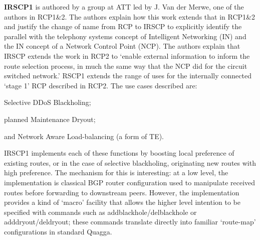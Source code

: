 \bigskip

\textbf{IRSCP1} \cite{VanDerMerwe2006} is authored by a group at ATT led by J. Van der Merwe, one of the authors in RCP1\&2.
The authors explain how this work extends that in RCP1\&2 and justify the change of name from RCP to IRSCP to explicitly identify the parallel with the telephony systems concept of Intelligent Networking (IN) and the IN concept of a Network Control Point (NCP).
The authors explain that IRSCP extends the work in RCP2 to `enable external information to inform the route selection process, in much the same way that the NCP did for the circuit switched network.'
RSCP1 extends the range of uses for the internally connected `stage 1' RCP described in RCP2.
The use cases described are:
\begin{myitemize}
    \item Selective DDoS Blackholing;
    \item planned Maintenance Dryout;
    \item and Network Aware Load-balancing (a form of TE).
\end{myitemize}
IRSCP1 implements each of these functions by boosting local preference of existing routes, or in the case of selective blackholing, originating new routes with high preference.
The mechanism for this is interesting: at a low level, the implementation is classical BGP router configuration used to manipulate received routes before forwarding to downstream peers. However, the implementation provides a kind of `macro' facility that allows the higher level intention to be specified with commands such as addblackhole/delblackhole or adddryout/deldryout; these commands translate directly into familiar `route-map' configurations in standard Quagga.

\bigskip


